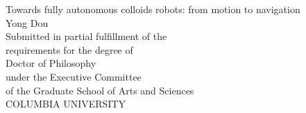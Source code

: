 
\begin{titlepage}
\begin{center}

\begin{singlespacing}
\vspace*{6\baselineskip}
Towards fully autonomous  colloids robots: from motion to navigation\\
\vspace{3\baselineskip}
Yong Dou\\
\vspace{18\baselineskip}
Submitted in partial fulfillment of the\\
requirements for the degree of\\
Doctor of Philosophy\\
under the Executive Committee\\
of the Graduate School of Arts and Sciences\\
\vspace{3\baselineskip}
COLUMBIA UNIVERSITY\\
\vspace{3\baselineskip}
\the\year
\vfill


\end{singlespacing}

\end{center}
\end{titlepage}


